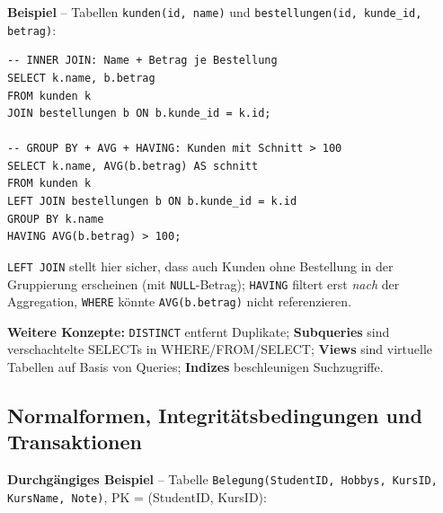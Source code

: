 \textbf{Beispiel} -- Tabellen \texttt{kunden(id, name)} und \texttt{bestellungen(id, kunde\_id, betrag)}:

\begin{verbatim}
-- INNER JOIN: Name + Betrag je Bestellung
SELECT k.name, b.betrag
FROM kunden k
JOIN bestellungen b ON b.kunde_id = k.id;

-- GROUP BY + AVG + HAVING: Kunden mit Schnitt > 100
SELECT k.name, AVG(b.betrag) AS schnitt
FROM kunden k
LEFT JOIN bestellungen b ON b.kunde_id = k.id
GROUP BY k.name
HAVING AVG(b.betrag) > 100;
\end{verbatim}
\texttt{LEFT JOIN} stellt hier sicher, dass auch Kunden ohne Bestellung in der Gruppierung erscheinen (mit \texttt{NULL}-Betrag); \texttt{HAVING} filtert erst \emph{nach} der Aggregation, \texttt{WHERE} könnte \texttt{AVG(b.betrag)} nicht referenzieren.

\textbf{Weitere Konzepte:} \texttt{DISTINCT} entfernt Duplikate; \textbf{Subqueries} sind verschachtelte SELECTs in WHERE/FROM/SELECT; \textbf{Views} sind virtuelle Tabellen auf Basis von Queries; \textbf{Indizes} beschleunigen Suchzugriffe.

\newpage

\subsection{Normalformen, Integritätsbedingungen und Transaktionen}


\textbf{Durchgängiges Beispiel} -- Tabelle \texttt{Belegung(StudentID, Hobbys, KursID, KursName, Note)}, PK = (StudentID, KursID):

